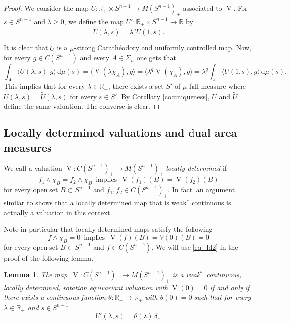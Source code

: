 \documentclass[11pt, a4paper]{amsart}
\newtheorem{lemma}[proposition]{Lemma}
\renewcommand{\d}{\,\mathrm{d}}
\newcommand{\rp}{\mathbb R_{\scriptscriptstyle +}}
\newcommand{\sn}{{S^{n-1}}}
\renewcommand{\d}{\,\mathrm{d}}
\newcommand{\oV}{\operatorname{V}}
\newcommand{\measn}{M(\sn )_{\scriptscriptstyle +}}
\newcommand{\cfn}{C(\sn )_{\scriptscriptstyle +}}
\newcommand{\R}{\mathbb R}
\begin{document}
\begin{proof}
  

We consider the map  $U\colon \rp \times \sn \to \measn$ associated to $\oV$. 
For $s\in \sn $ and $\lambda\ge 0$, we define the map 
$U'\colon\rp\times \sn \to \R$ by 
$$
\tilde U(\lambda, s)=\lambda^q U(1,s).
$$

It is clear that $\tilde U$ is a $\mu$-strong Carath\'eodory and uniformly controlled map. Now, for every $g\in C(\sn)$ and every $A\in \Sigma_n$ one gets that
\[
    \int_A \!\langle U(\lambda,s),g\rangle\d\mu(s)=\langle \overline{\oV}(\lambda\chi_A),g\rangle=\langle \lambda^q \overline{\oV}(\chi_A),g\rangle=\lambda^q\int_A\! \langle U(1,s),g\rangle\d\mu(s).
\]
This implies that for every $\lambda\in\mathbb{R}_+$, there exists a set $S'$ of $\mu$-full measure where $U(\lambda,s)=\tilde U(\lambda,s)$ for every $s\in S'$. By Corollary \ref{co:uniqueness}, $U$ and $\tilde U$ define the same valuation. The converse is clear. 
\end{proof}

\goodbreak

\subsection{Locally determined valuations and dual area measures}\label{ss:ld}

We call a valuation $\oV\colon \cfn\to \measn$  {\em locally determined} if  
\begin{equation}\label{eq:locallydet}
f_1\wedge \chi_B = f_2\wedge \chi_B \,\text{ implies }\, \oV(f_1)(B)=\oV(f_2)(B)    
\end{equation} 
for every open set $B\subset \sn$ and  $f_1, f_2 \in \cfn$. In fact, an argument similar to \cite{Jonas2026} shows that a locally determined map that is weak$^*$ continuous is actually a valuation in this context. 


Note in particular that locally determined maps satisfy the following 
\begin{equation}\label{eq_ld2}
    f\wedge \chi_B = 0 \,\text{ implies }\, \oV(f)(B)=V(0)(B)=0
\end{equation}
for every open set $B\subset \sn$ and  $f \in C(\sn )$. We will use \eqref{eq_ld2} in the proof of the following lemma. 

\begin{lemma}\label{l:locally determined}
The map $\,\oV\colon \cfn\to \measn$ is a weak$^*$~continuous, locally determined, rotation equivariant valuation with $\oV(0)=0$ if and only if there exists a continuous function $\theta\colon\rp\to \rp$ with $\theta(0)=0$ such that for every $\lambda \in \R_+$ and  $s\in \sn $
\[
U'(\lambda, s) = \theta(\lambda)\,\delta_s.
\]
\end{lemma}
\end{document}
